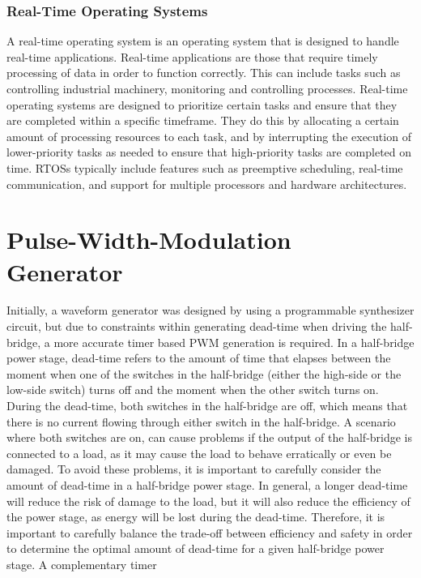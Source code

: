 \subsubsection{Real-Time Operating Systems}
A real-time operating system is an operating system that is designed to handle real-time applications. Real-time applications are those that require timely processing of data in order to function correctly. This can include tasks such as controlling industrial machinery, monitoring and controlling processes. Real-time operating systems are designed to prioritize certain tasks and ensure that they are completed within a specific timeframe. They do this by allocating a certain amount of processing resources to each task, and by interrupting the execution of lower-priority tasks as needed to ensure that high-priority tasks are completed on time. RTOSs typically include features such as preemptive scheduling, real-time communication, and support for multiple processors and hardware architectures.

\section{Pulse-Width-Modulation Generator}
Initially, a waveform generator was designed by using a programmable synthesizer circuit, but due to constraints within generating dead-time when driving the half-bridge, a more accurate timer based PWM generation is required. In a half-bridge power stage, dead-time refers to the amount of time that elapses between the moment when one of the switches in the half-bridge (either the high-side or the low-side switch) turns off and the moment when the other switch turns on. During the dead-time, both switches in the half-bridge are off, which means that there is no current flowing through either switch in the half-bridge. A scenario where both switches are on, can cause problems if the output of the half-bridge is connected to a load, as it may cause the load to behave erratically or even be damaged. To avoid these problems, it is important to carefully consider the amount of dead-time in a half-bridge power stage. In general, a longer dead-time will reduce the risk of damage to the load, but it will also reduce the efficiency of the power stage, as energy will be lost during the dead-time. Therefore, it is important to carefully balance the trade-off between efficiency and safety in order to determine the optimal amount of dead-time for a given half-bridge power stage.
A complementary timer

